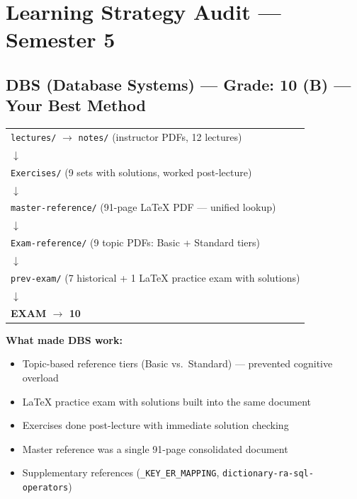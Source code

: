 \documentclass[11pt,a4paper]{article}
\begin{document}
\vspace{1em}

\section{Learning Strategy Audit --- Semester 5}

\subsection{DBS (Database Systems) --- Grade: \textcolor{successgreen}{10 (B)} --- Your Best Method}

\begin{center}
\begin{tabular}{l}
\texttt{lectures/} $\rightarrow$ \texttt{notes/} (instructor PDFs, 12 lectures) \\
\hspace{3em}$\downarrow$ \\
\texttt{Exercises/} (9 sets with solutions, worked post-lecture) \\
\hspace{3em}$\downarrow$ \\
\texttt{master-reference/} (91-page LaTeX PDF --- unified lookup) \\
\hspace{3em}$\downarrow$ \\
\texttt{Exam-reference/} (9 topic PDFs: Basic + Standard tiers) \\
\hspace{3em}$\downarrow$ \\
\texttt{prev-exam/} (7 historical + 1 LaTeX practice exam with solutions) \\
\hspace{3em}$\downarrow$ \\
\textbf{EXAM $\rightarrow$ 10}
\end{tabular}
\end{center}

\textbf{What made DBS work:}
\begin{itemize}[nosep]
\item Topic-based reference tiers (Basic vs.\ Standard) --- prevented cognitive overload
\item LaTeX practice exam with solutions built into the same document
\item Exercises done post-lecture with immediate solution checking
\item Master reference was a single 91-page consolidated document
\item Supplementary references (\texttt{\_KEY\_ER\_MAPPING}, \texttt{dictionary-ra-sql-operators})
\end{itemize}
\end{document}
